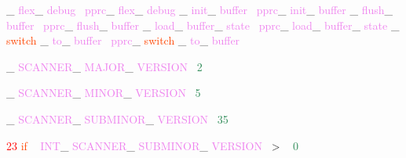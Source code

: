 \documentclass[8, usernames, dvipsnames]{beamer}
\begin{document}
\begin{frame}
\textcolor{Sepia}{\_}
\textcolor{Violet}{flex}\textcolor{Sepia}{\_}
\textcolor{Violet}{debug}\textcolor{White}{\ }
\textcolor{Violet}{pprc}\textcolor{Sepia}{\_}
\textcolor{Violet}{flex}\textcolor{Sepia}{\_}
\textcolor{Violet}{debug}
 \textcolor{Sepia}{\_}
\textcolor{Violet}{init}\textcolor{Sepia}{\_}
\textcolor{Violet}{buffer}\textcolor{White}{\ }
\textcolor{Violet}{pprc}\textcolor{Sepia}{\_}
\textcolor{Violet}{init}\textcolor{Sepia}{\_}
\textcolor{Violet}{buffer}
 \textcolor{Sepia}{\_}
\textcolor{Violet}{flush}\textcolor{Sepia}{\_}
\textcolor{Violet}{buffer}\textcolor{White}{\ }
\textcolor{Violet}{pprc}\textcolor{Sepia}{\_}
\textcolor{Violet}{flush}\textcolor{Sepia}{\_}
\textcolor{Violet}{buffer}
 \textcolor{Sepia}{\_}
\textcolor{Violet}{load}\textcolor{Sepia}{\_}
\textcolor{Violet}{buffer}\textcolor{Sepia}{\_}
\textcolor{Violet}{state}\textcolor{White}{\ }
\textcolor{Violet}{pprc}\textcolor{Sepia}{\_}
\textcolor{Violet}{load}\textcolor{Sepia}{\_}
\textcolor{Violet}{buffer}\textcolor{Sepia}{\_}
\textcolor{Violet}{state}
 \textcolor{Sepia}{\_}
\textcolor{OrangeRed}{switch}
\textcolor{Sepia}{\_}
\textcolor{Violet}{to}\textcolor{Sepia}{\_}
\textcolor{Violet}{buffer}\textcolor{White}{\ }
\textcolor{Violet}{pprc}\textcolor{Sepia}{\_}
\textcolor{OrangeRed}{switch}
\textcolor{Sepia}{\_}
\textcolor{Violet}{to}\textcolor{Sepia}{\_}
\textcolor{Violet}{buffer}
 
 \textcolor{Sepia}{\_}
\textcolor{Violet}{SCANNER}\textcolor{Sepia}{\_}
\textcolor{Violet}{MAJOR}\textcolor{Sepia}{\_}
\textcolor{Violet}{VERSION}\textcolor{White}{\ }
\textcolor{SeaGreen}{2}

 \textcolor{Sepia}{\_}
\textcolor{Violet}{SCANNER}\textcolor{Sepia}{\_}
\textcolor{Violet}{MINOR}\textcolor{Sepia}{\_}
\textcolor{Violet}{VERSION}\textcolor{White}{\ }
\textcolor{SeaGreen}{5}

 \textcolor{Sepia}{\_}
\textcolor{Violet}{SCANNER}\textcolor{Sepia}{\_}
\textcolor{Violet}{SUBMINOR}\textcolor{Sepia}{\_}
\textcolor{Violet}{VERSION}\textcolor{White}{\ }
\textcolor{SeaGreen}{35}

  \textcolor{Red}{23}
\textcolor{OrangeRed}{if}
\textcolor{White}{\ }
\textcolor{Violet}{INT}\textcolor{Sepia}{\_}
\textcolor{Violet}{SCANNER}\textcolor{Sepia}{\_}
\textcolor{Violet}{SUBMINOR}\textcolor{Sepia}{\_}
\textcolor{Violet}{VERSION}\textcolor{White}{\ }
\textcolor{OliveGreen}{\textgreater}
\textcolor{White}{\ }
\textcolor{SeaGreen}{0}

 \end{frame}
\end{document}
